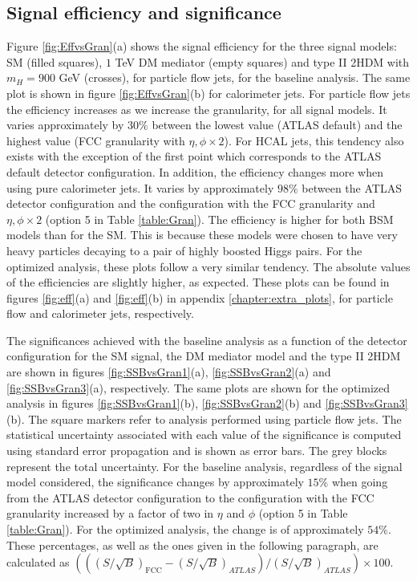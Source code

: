 \subsection{Signal efficiency and significance}
\label{sec:granstudies}

Figure \ref{fig:EffvsGran}(a) shows the signal efficiency for the three signal models: SM (filled squares), $1$ TeV DM mediator (empty squares) and type II 2HDM with $m_H=900$ GeV (crosses), for particle flow jets, for the baseline analysis. The same plot is shown in figure \ref{fig:EffvsGran}(b) for calorimeter jets. 
For particle flow jets the efficiency increases as we increase the granularity, for all signal models. It varies approximately by $30\%$ between the lowest value (ATLAS default) and the highest value (FCC granularity with $\eta,\phi\times 2$). For HCAL jets, this tendency also exists with the exception of the first point which corresponds to the ATLAS default detector configuration. In addition, the efficiency changes more when using pure calorimeter jets. It varies by approximately $98\%$ between the ATLAS detector configuration and the configuration with the FCC granularity and $\eta,\phi\times 2$ (option 5 in Table \ref{table:Gran}).
The efficiency is higher for both BSM models than for the SM. This is because these models were chosen to have very heavy particles decaying to a pair of highly boosted Higgs pairs. For the optimized analysis, these plots follow a very similar tendency. The absolute values of the efficiencies are slightly higher, as expected. These plots can be found in figures \ref{fig:eff}(a) and \ref{fig:eff}(b) in appendix \ref{chapter:extra_plots}, for particle flow and calorimeter jets, respectively.

The significances achieved with the baseline analysis as a function of the detector configuration for the SM signal, the DM mediator model and the type II 2HDM are shown in figures \ref{fig:SSBvsGran1}(a), \ref{fig:SSBvsGran2}(a) and \ref{fig:SSBvsGran3}(a), respectively. The same plots are shown for the optimized analysis in figures \ref{fig:SSBvsGran1}(b), \ref{fig:SSBvsGran2}(b) and \ref{fig:SSBvsGran3}(b). The square markers refer to analysis performed using particle flow jets. The statistical uncertainty associated with each value of the significance is computed using standard error propagation and is shown as error bars. The grey blocks represent the total uncertainty.
For the baseline analysis, regardless of the signal model considered, the significance changes by approximately $15\%$ when going from the ATLAS detector configuration to the configuration with the FCC granularity increased by a factor of two in $\eta$ and $\phi$ (option 5 in Table \ref{table:Gran}). For the optimized analysis, the change is of approximately $54\%$. These percentages, as well as the ones given in the following paragraph, are calculated as $\left(((S/\sqrt{B})_{\text{FCC}}-(S/\sqrt{B})_{ATLAS})/(S/\sqrt{B})_{ATLAS}\right)\times 100$.

